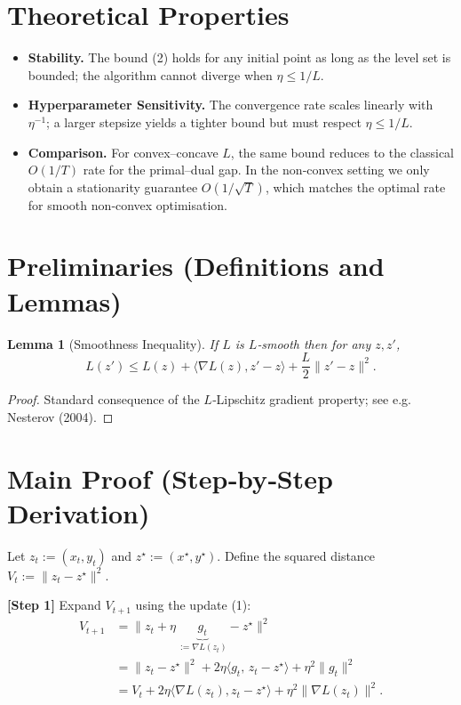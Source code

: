 \documentclass{article}
\newtheorem{lemma}{Lemma}
\begin{document}
\section*{Theoretical Properties}
\begin{itemize}
\item \textbf{Stability.} The bound (2) holds for any initial point as long as the level set is bounded; the algorithm cannot diverge when $\eta\le 1/L$.
\item \textbf{Hyperparameter Sensitivity.} The convergence rate scales linearly with $\eta^{-1}$; a larger stepsize yields a tighter bound but must respect $\eta\le 1/L$.
\item \textbf{Comparison.} For convex–concave $L$, the same bound reduces to the classical $O(1/T)$ rate for the primal–dual gap. In the non‑convex setting we only obtain a stationarity guarantee $O(1/\sqrt{T})$, which matches the optimal rate for smooth non‑convex optimisation.
\end{itemize}

\section*{Preliminaries (Definitions and Lemmas)}
\begin{lemma}[Smoothness Inequality]\label{lem:smooth}
If $L$ is $L$‑smooth then for any $z,z'$,
\[
L(z')\le L(z)+\langle \nabla L(z),z'-z\rangle +\frac{L}{2}\|z'-z\|^{2}.
\tag{3}
\]
\end{lemma}
\begin{proof}
Standard consequence of the $L$‑Lipschitz gradient property; see e.g. Nesterov (2004). \qedhere
\end{proof}

\section*{Main Proof (Step‑by‑Step Derivation)}
Let $z_t:=(x_t,y_t)$ and $z^\star:=(x^\star,y^\star)$.  
Define the squared distance $V_t:=\|z_t-z^\star\|^{2}$.

\noindent\textbf{[Step 1]} Expand $V_{t+1}$ using the update (1):
\[
\begin{aligned}
V_{t+1}
&=\bigl\|z_t+\eta\,\underbrace{g_t}_{:=\nabla L(z_t)}-z^\star\bigr\|^{2}\\
&=\|z_t-z^\star\|^{2}
+2\eta\langle g_t,\,z_t-z^\star\rangle
+\eta^{2}\|g_t\|^{2}\\
&=V_t+2\eta\langle \nabla L(z_t),z_t-z^\star\rangle
+\eta^{2}\|\nabla L(z_t)\|^{2}.
\end{aligned}
\tag{4}
\]
\end{document}
